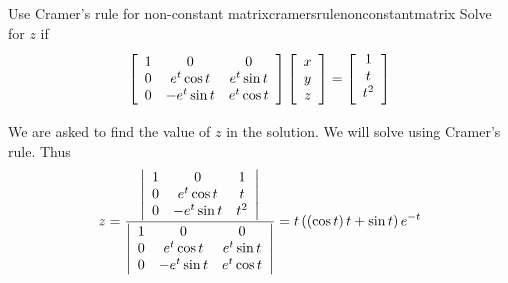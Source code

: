 \begin{example}{Use Cramer's rule for non-constant matrix}{cramersrulenonconstantmatrix}
Solve for $z$ if
\begin{equation*}
\leftB
\begin{array}{ccc}
1 & 0 & 0 \\
0 & e^{t}\cos t & e^{t}\sin t \\
0 & -e^{t}\sin t & e^{t}\cos t
\end{array}
\rightB \leftB
\begin{array}{c}
x \\
y \\
z
\end{array}
\rightB =\leftB
\begin{array}{c}
1 \\
t \\
\vspace{0.05in}t^{2}
\end{array}
\rightB
\end{equation*}
\end{example}

\begin{solution} We are asked to find the value of $z$ in the solution. We will solve using Cramer's rule.
 Thus
\begin{equation*}
z=\vspace{.05in} \frac{\left|
\begin{array}{ccc}
1 & 0 & 1 \\
0 & e^{t}\cos t & t \\
0 & -e^{t}\sin t & t^{2}
\end{array}
\right| }{\left|
\begin{array}{ccc}
1 & 0 & 0 \\
0 & e^{t}\cos t & e^{t}\sin t \\
0 & -e^{t}\sin t & e^{t}\cos t
\end{array}
\right| }=\allowbreak t\left( \left( \cos t\right) t+\sin t\right) e^{-t}
\end{equation*}
\end{solution}
